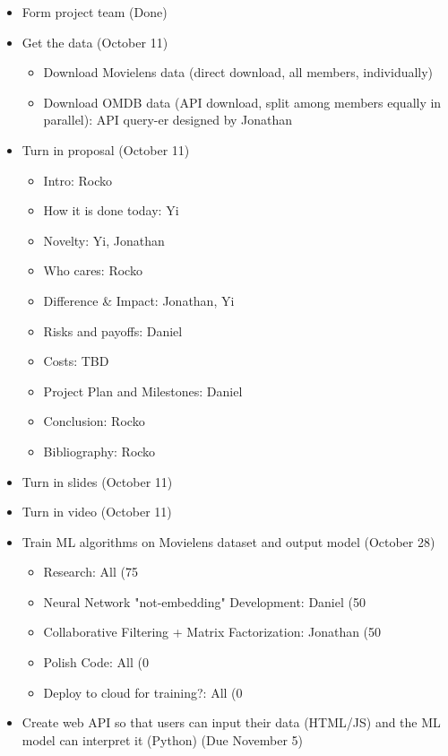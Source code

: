 \documentclass[sigchi, 12pt, nonacm=true, timestamp=true, screen=true]{acmart}
\begin{document}
\begin{itemize}
  \item Form project team (Done)
  \item Get the data (October 11)
    \begin{itemize}
      \item Download Movielens data (direct download, all members, individually) 
      \item Download OMDB data (API download, split among members equally in parallel): API query-er designed by Jonathan
    \end{itemize}
  \item Turn in proposal (October 11)
    \begin{itemize}
      \item Intro: Rocko
      \item How it is done today: Yi
      \item Novelty: Yi, Jonathan
      \item Who cares: Rocko
      \item Difference & Impact: Jonathan, Yi
      \item Risks and payoffs: Daniel
      \item Costs: TBD
      \item Project Plan and Milestones: Daniel
      \item Conclusion: Rocko
      \item Bibliography: Rocko
    \end{itemize}
  \item Turn in slides (October 11)
  \item Turn in video (October 11)
  \item Train ML algorithms on Movielens dataset and output model (October 28)
    \begin{itemize}
      \item Research: All (75%
      \item Neural Network "not-embedding" Development: Daniel (50%
      \item Collaborative Filtering + Matrix Factorization: Jonathan (50%
      \item Polish Code: All (0%
      \item Deploy to cloud for training?: All (0%
    \end{itemize}
  \item Create web API so that users can input their data (HTML/JS) and the ML model can interpret it (Python) (Due November 5)

\end{itemize}
\end{document}
